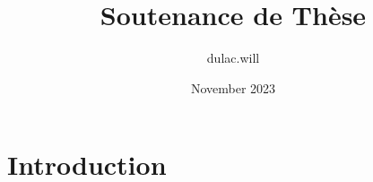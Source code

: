 \documentclass{article}
\title{Soutenance de Thèse}
\author{dulac.will }
\date{November 2023}
\begin{document}
\maketitle

\section{Introduction}
\end{document}
